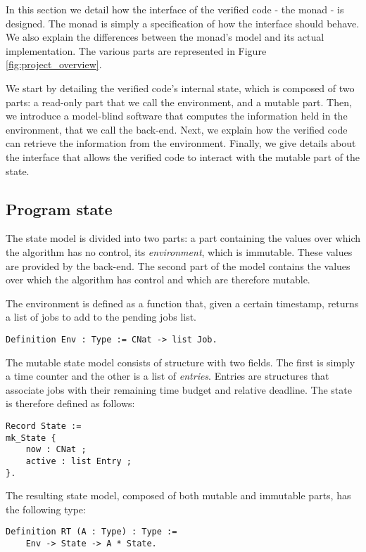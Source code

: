 	In this section we detail how the interface of the verified code - the monad - is designed. The monad is simply a specification of how the interface should behave. We also explain the differences between the monad's model and its actual implementation.
	The various parts are represented in Figure \ref{fig:project_overview}.

	We start by detailing the verified code's internal state, which is composed of two parts: a read-only part that we call the environment, and a mutable part. Then, we introduce a model-blind software that computes the information held in the environment, that we call the back-end. Next, we  explain how the verified code can retrieve the information from the environment. Finally, we give details about the interface that allows the verified code to interact with the mutable part of the state.

	\subsection{Program state}

	The state model is divided into two parts: a part containing the values over which the algorithm has no control, its \emph{environment}, which is immutable. These values are provided by the back-end. The second part of the model contains the values over which the algorithm has control and which are therefore mutable.

	The environment is defined as a function that, given a certain timestamp, returns a list of jobs to add to the pending jobs list.
	\begin{verbatim}
Definition Env : Type := CNat -> list Job.
	\end{verbatim}

	The mutable state model consists of structure with two fields. The first is simply a time counter and the other is a list of \emph{entries}. Entries are structures that associate jobs with their remaining time budget and relative deadline. The state is therefore defined as follows:
	\begin{verbatim}
Record State := 
mk_State {
    now : CNat ;
    active : list Entry ;
}.
	\end{verbatim}

	The resulting state model, composed of both mutable and immutable parts, has the following type:
	\begin{verbatim}
Definition RT (A : Type) : Type :=
    Env -> State -> A * State.
	\end{verbatim}

